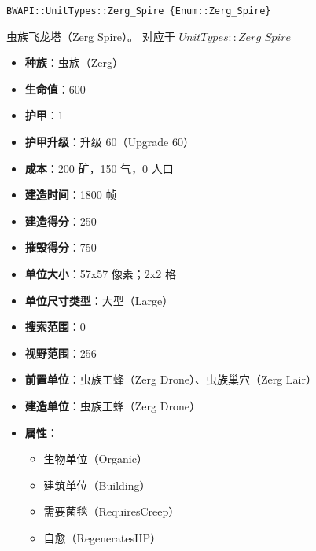 \begin{tcolorbox}[colback=white, colframe=black!60!white, title=Zerg\_Spire(), arc=0mm]
    \begin{verbatim}
BWAPI::UnitTypes::Zerg_Spire {Enum::Zerg_Spire}
    \end{verbatim}
    虫族飞龙塔（Zerg Spire）。
    对应于  $UnitTypes::Zerg\_Spire$ 
    \begin{itemize}
        \item \textbf{种族}：虫族（Zerg）
        \item \textbf{生命值}：600
        \item \textbf{护甲}：1
        \item \textbf{护甲升级}：升级 60（Upgrade 60）
        \item \textbf{成本}：200 矿，150 气，0 人口
        \item \textbf{建造时间}：1800 帧
        \item \textbf{建造得分}：250
        \item \textbf{摧毁得分}：750
        \item \textbf{单位大小}：57x57 像素；2x2 格
        \item \textbf{单位尺寸类型}：大型（Large）
        \item \textbf{搜索范围}：0
        \item \textbf{视野范围}：256
        \item \textbf{前置单位}：虫族工蜂（Zerg Drone）、虫族巢穴（Zerg Lair）
        \item \textbf{建造单位}：虫族工蜂（Zerg Drone）
        \item \textbf{属性}：
            \begin{itemize}
                \item 生物单位（Organic）
                \item 建筑单位（Building）
                \item 需要菌毯（RequiresCreep）
                \item 自愈（RegeneratesHP）
            \end{itemize}
    \end{itemize}
\end{tcolorbox}

